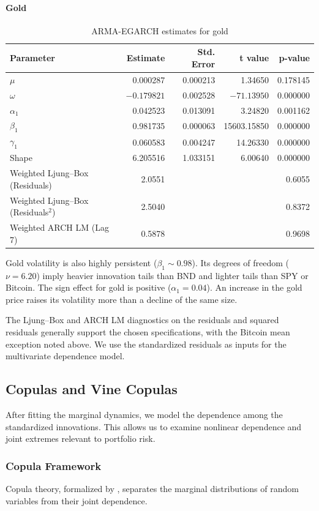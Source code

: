 \documentclass[12pt,a4paper]{article}
\begin{document}
\paragraph{Gold}
\begin{table}[H]
\centering
\begin{tabular}{lrrrr}
\toprule
Parameter & Estimate & Std. Error & t value & p-value \\
\midrule
$\mu$ & 0.000287 & 0.000213 & 1.34650 & 0.178145 \\
$\omega$ & $-0.179821$ & 0.002528 & $-71.13950$ & 0.000000 \\
$\alpha_1$ & 0.042523 & 0.013091 & 3.24820 & 0.001162 \\
$\beta_1$ & 0.981735 & 0.000063 & 15603.15850 & 0.000000 \\
$\gamma_1$ & 0.060583 & 0.004247 & 14.26330 & 0.000000 \\
Shape & 6.205516 & 1.033151 & 6.00640 & 0.000000 \\
\midrule
Weighted Ljung--Box (Residuals) & 2.0551 & & & 0.6055 \\
Weighted Ljung--Box (Residuals$^2$) & 2.5040 & & & 0.8372 \\
Weighted ARCH LM (Lag 7) & 0.5878 & & & 0.9698 \\
\bottomrule
\end{tabular}
\caption{ARMA-EGARCH estimates for gold}
\end{table}
Gold volatility is also highly persistent ($\beta_1 \sim 0.98$). Its degrees of freedom ($\nu=6.20$) imply heavier innovation tails than BND and lighter tails than SPY or Bitcoin.
The sign effect for gold is positive ($\alpha_1=0.04$). An increase in the gold price raises its volatility more than a decline of the same size.

The Ljung--Box and ARCH LM diagnostics on the residuals and squared residuals generally support the chosen specifications, with the Bitcoin mean exception noted above. We use the standardized residuals as inputs for the multivariate dependence model.

\subsection{Copulas and Vine Copulas}

After fitting the marginal dynamics, we model the dependence among the standardized innovations. This allows us to examine nonlinear dependence and joint extremes relevant to portfolio risk.

\subsubsection{Copula Framework}
Copula theory, formalized by \citet{sklar1959}, separates the marginal distributions of random variables from their joint dependence.
\end{document}
